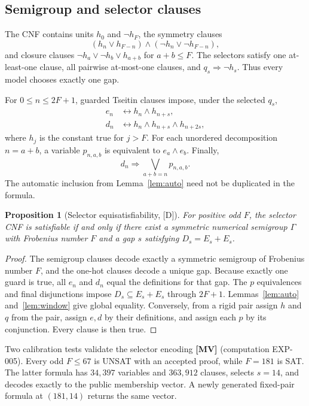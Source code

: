 \documentclass[11pt]{article}
\newtheorem{proposition}[theorem]{Proposition}
\theoremstyle{definition}
\theoremstyle{remark}
\begin{document}
\subsection{Semigroup and selector clauses}

The CNF contains units $h_0$ and $\neg h_F$, the symmetry clauses
\[
 (h_n\lor h_{F-n})\land(\neg h_n\lor\neg h_{F-n}),
\]
and closure clauses $\neg h_a\lor\neg h_b\lor h_{a+b}$ for $a+b\le F$. The selectors satisfy one
at-least-one clause, all pairwise at-most-one clauses, and
$q_s\Rightarrow\neg h_s$. Thus every model chooses exactly one gap.

For $0\le n\le2F+1$, guarded Tseitin clauses impose, under the selected $q_s$,
\begin{align*}
 e_n &\longleftrightarrow h_n\land h_{n+s},\\
 d_n &\longleftrightarrow h_n\land h_{n+s}\land h_{n+2s},
\end{align*}
where $h_j$ is the constant true for $j>F$. For each unordered decomposition $n=a+b$, a variable
$p_{n,a,b}$ is equivalent to $e_a\land e_b$. Finally,
\[
 d_n\Rightarrow\bigvee_{a+b=n}p_{n,a,b}.
\]
The automatic inclusion from Lemma~\ref{lem:auto} need not be duplicated in the formula.

\begin{proposition}[Selector equisatisfiability, {[D]}]\label{prop:cnf}
For positive odd $F$, the selector CNF is satisfiable if and only if there exist a symmetric
numerical semigroup $\Gamma$ with Frobenius number $F$ and a gap $s$ satisfying
$D_s=E_s+E_s$.
\end{proposition}
\begin{proof}
The semigroup clauses decode exactly a symmetric semigroup of Frobenius number $F$, and the one-hot
clauses decode a unique gap. Because exactly one guard is true, all $e_n$ and $d_n$ equal the
definitions for that gap. The $p$ equivalences and final disjunctions impose
$D_s\subseteq E_s+E_s$ through $2F+1$. Lemmas~\ref{lem:auto} and~\ref{lem:window} give global
equality. Conversely, from a rigid pair assign $h$ and $q$ from the pair, assign $e,d$ by their
definitions, and assign each $p$ by its conjunction. Every clause is then true.
\end{proof}

Two calibration tests validate the selector encoding \textbf{[MV]} (computation EXP-005). Every
odd $F\le67$ is UNSAT with an accepted proof, while $F=181$ is SAT. The latter formula has
$34{,}397$ variables and $363{,}912$ clauses, selects $s=14$, and decodes exactly to the public
membership vector. A newly
generated fixed-pair formula at $(181,14)$ returns the same vector.
\end{document}
